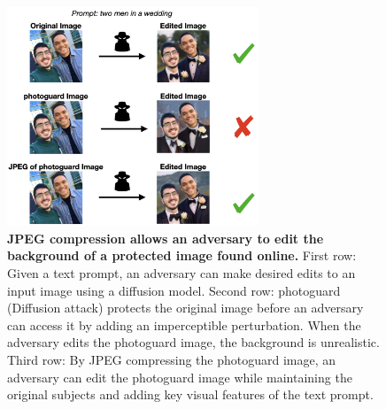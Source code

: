 \begin{figure}[t]
\begin{center}
\includegraphics[width=0.67\textwidth]{images/complex-diffusion-inpaint.001.png}
\end{center}
\caption{\textbf{JPEG compression allows an adversary to edit the background of a protected image found online.} First row: Given a text prompt, an adversary can make desired edits to an input image using a diffusion model. Second row: photoguard (Diffusion attack) \citep{salman2023raising} protects the original image before an adversary can access it by adding an imperceptible perturbation. When the adversary edits the photoguard image, the background is unrealistic. Third row: By JPEG compressing the photoguard image, an adversary can edit the photoguard image while maintaining the original subjects and adding key visual features of the text prompt.}
\label{fig:inpainting-overview}
\end{figure}